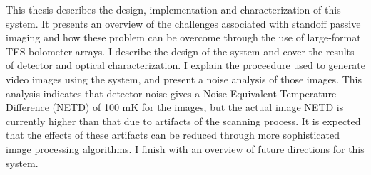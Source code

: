 \documentclass[12pt,letterpaper]{memoir}
\numberwithin{equation}{chapter}
\numberwithin{figure}{chapter}
\numberwithin{table}{chapter}
\begin{document}
This thesis describes the design, implementation and characterization of this system.
It presents an overview of the challenges associated with standoff passive imaging and how these problem can be overcome through the use of large-format TES bolometer arrays.
I describe the design of the system and cover the results of detector and optical characterization.
I explain the proceedure used to generate video images using the system, and present a noise analysis of those images.
This analysis indicates that detector noise gives a Noise Equivalent Temperature Difference (NETD) of 100 mK for the images, but the actual image NETD is currently higher than that due to artifacts of the scanning process.
It is expected that the effects of these artifacts can be reduced through more sophisticated image processing algorithms.
I finish with an overview of future directions for this system.

\newpage

\tableofcontents* %

\newpage
\listoftables

\newpage
\listoffigures

\mainmatter

















\SingleSpacing
\printbibliography
\end{document}
